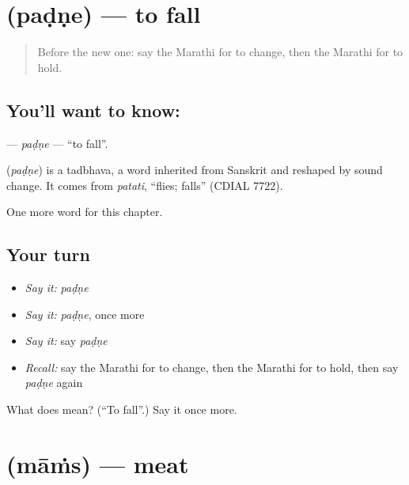 \section[\texorpdfstring{\mr{पडणे} (paḍṇe)}{पडणे (paḍṇe)}]{ (paḍṇe) — to fall}

\label{lesson:MR-C84-padne}



\begin{quote}
Before the new one: say the Marathi for to change, then the Marathi for to hold.
\end{quote}

\subsection*{You'll want to know: }
\textbf{} — \emph{paḍṇe} — \textquotedblleft{}to fall\textquotedblright{}.

\begin{cousinweb}
\textbf{} (\emph{paḍṇe}) is a tadbhava, a word inherited from Sanskrit and reshaped by sound change. It comes from \emph{patati}, \textquotedblleft{}flies; falls\textquotedblright{} (CDIAL 7722).
\end{cousinweb}

\begin{grammarlens}[title={What you've built}]
One more word for this chapter.
\end{grammarlens}

\subsection*{Your turn}
\begin{itemize}
\raggedright
  \item \emph{Say it:} \emph{paḍṇe}
  \item \emph{Say it:} \emph{paḍṇe}, once more
  \item \emph{Say it:} say \emph{paḍṇe}
  \item \emph{Recall:} say the Marathi for to change, then the Marathi for to hold, then say \emph{paḍṇe} again
\end{itemize}

\begin{tcolorbox}[breakable,colback=teal!4,colframe=teal!35!black,title={Before you move on}]
What does  mean? (\textquotedblleft{}To fall\textquotedblright{}.) Say it once more.
\end{tcolorbox}
\section[\texorpdfstring{\mr{मांस} (māṁs)}{मांस (māṁs)}]{ (māṁs) — meat}

